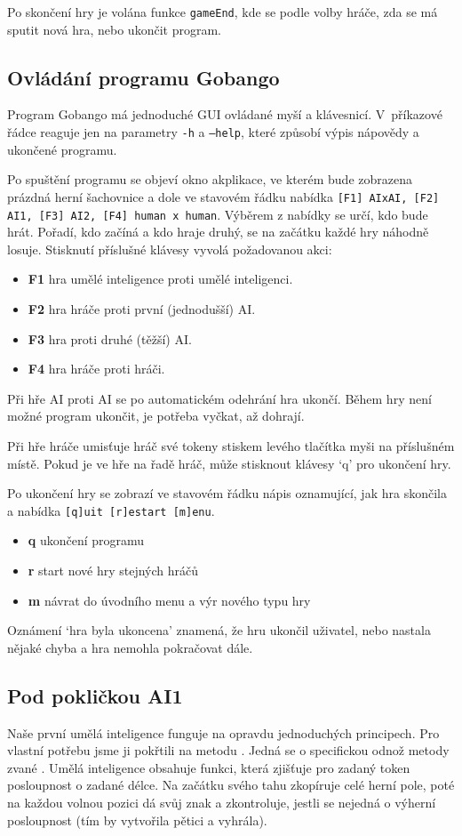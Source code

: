 \documentclass[a4paper,11pt,titlepage]{article}
\begin{document}
Po skončení hry je volána funkce {\tt gameEnd}, kde se podle volby hráče, zda se má sputit nová hra, nebo ukončit program.

\subsection{Ovládání programu Gobango}
Program Gobango má jednoduché GUI ovládané myší a klávesnicí. V~pří\-ka\-zo\-vé řádce reaguje jen na parametry {\tt -h} a {\tt --help}, které způsobí výpis nápovědy a ukončené programu.

Po spu\-ště\-ní programu se objeví okno akplikace, ve kterém bude zobrazena prázdná herní šachovnice a dole ve stavovém řádku nabídka {\tt [F1] AIxAI, [F2] AI1, [F3] AI2, [F4] human x human}. Výběrem z nabídky se určí, kdo bude hrát. Pořadí, kdo začíná a kdo hraje druhý, se na začátku každé hry náhodně losuje. Stisknutí příslušné klávesy vyvolá požadovanou akci: 
\begin{itemize} 
\item {\bf F1} hra umělé inteligence proti umělé inteligenci. 
\item {\bf F2} hra hráče proti první (jednodušší) AI. 
\item {\bf F3} hra proti druhé (těžší) AI. 
\item {\bf F4} hra hráče proti hráči.
\end{itemize}
Při hře AI proti AI se po automatickém odehrání hra ukončí. Během hry není možné program ukončit, je potřeba vyčkat, až dohrají.

Při hře hráče umisťuje hráč své tokeny stiskem levého tlačítka myši na příslušném místě. Pokud je ve hře na řadě hráč, může stisknout klávesy `q' pro ukončení hry.

Po ukončení hry se zobrazí ve stavovém řádku nápis oznamující, jak hra skončila a nabídka {\tt [q]uit [r]estart [m]enu}.
\begin{itemize} 
\item {\bf q} ukončení programu
\item {\bf r} start nové hry stejných hráčů
\item {\bf m} návrat do úvodního menu a výr nového typu hry
\end{itemize}
Oznámení `hra byla ukoncena' znamená, že hru ukončil uživatel, nebo nastala nějaké chyba a hra nemohla pokračovat dále.

\subsection{Pod pokličkou AI1}
Naše první umělá inteligence funguje na opravdu jednoduchých principech. Pro vlastní potřebu jsme ji pokřtili na metodu . Jedná se o spe\-ci\-fic\-kou od\-nož me\-to\-dy zva\-né . Umělá inteligence obsahuje funkci, která zjišťuje pro zadaný token posloupnost o zadané délce. Na začátku svého tahu zkopíruje celé herní pole, poté na každou volnou pozici dá svůj znak a zkontroluje, jestli se nejedná o výherní posloupnost (tím by vytvořila pětici a vyhrála). 
\end{document}
